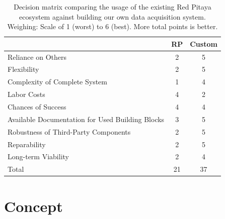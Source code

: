 \begin{table}
    \centering
    \caption{%
        Decision   matrix   comparing   the   usage  of   the   existing   Red
        Pitaya   ecosystem  against   building   our   own  data   acquisition
        system. Weighing: Scale  of \num{1}  (worst)  to \num{6}  (best). More
        total points is better.%
    }
    \label{tab:decision_matrix:pitaya_vs_own}
    \begin{tabular}{>{\raggedright}p{80mm}SS}
        \toprule
        & RP & Custom \\
        \midrule
        Reliance on Others &
        2 & 5 \\

        Flexibility &
        2 & 5 \\

        Complexity of Complete System &
        1 & 4 \\

        Labor Costs &
        4 & 2 \\

        Chances of Success &
        4 & 4 \\

        Available Documentation for Used Building Blocks &
        3 & 5 \\

        Robustness of Third-Party Components &
        2 & 5 \\

        Reparability &
        2 & 5 \\

        Long-term Viability&
        2 & 4 \\
        \midrule
        Total & 21 & 37 \\
        \bottomrule
    \end{tabular}
\end{table}

%
%
\section{Concept} %
\label{sec:mission:concept}

